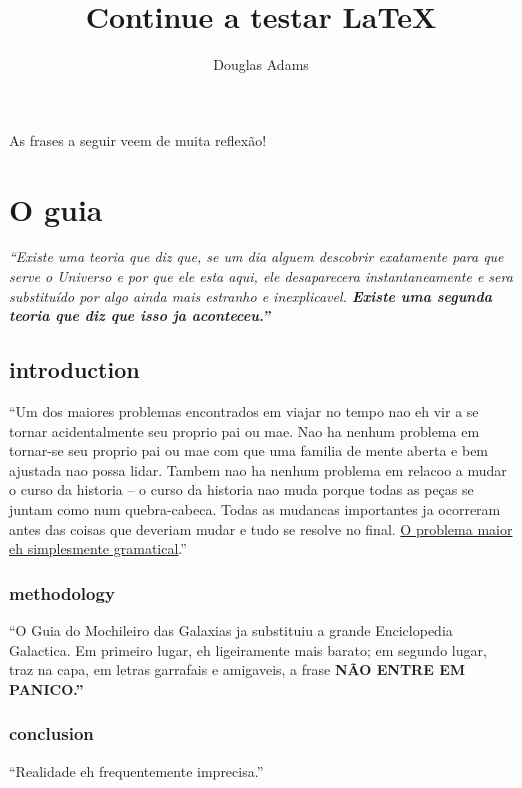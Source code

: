\documentclass[12pt]{article}
\title{Continue a testar \LaTeX}
\author{Douglas Adams}
\begin{document}
 
\maketitle
As frases a seguir veem de muita reflexão!

\chapter{\bf{O guia}}

\it{“Existe uma teoria que diz que, se um dia alguem descobrir exatamente para que serve o Universo e por que ele esta aqui, ele desaparecera instantaneamente e sera substituído por algo ainda mais estranho e inexplicavel. \bf{Existe uma segunda teoria que diz que isso ja aconteceu.}”}

\section{introduction}
 “Um dos maiores problemas encontrados em viajar no tempo nao eh vir a se tornar acidentalmente seu proprio pai ou mae. Nao ha nenhum problema em tornar-se seu proprio pai ou mae com que uma familia de mente aberta e bem ajustada nao possa lidar. Tambem nao ha nenhum problema em relacoo a mudar o curso da historia – o curso da historia nao muda porque todas as peças se juntam como num quebra-cabeca. Todas as mudancas importantes ja ocorreram antes das coisas que deveriam mudar e tudo se resolve no final. \underline{O problema maior eh simplesmente gramatical}.”

\subsection{methodology}
“O Guia do Mochileiro das Galaxias ja substituiu a grande Enciclopedia Galactica. Em primeiro lugar, eh ligeiramente mais barato; em segundo lugar, traz na capa, em letras garrafais e amigaveis, a frase \bf{NÃO ENTRE EM PANICO}.”

\subsection{conclusion}
“Realidade eh frequentemente imprecisa.”
\end{document}
